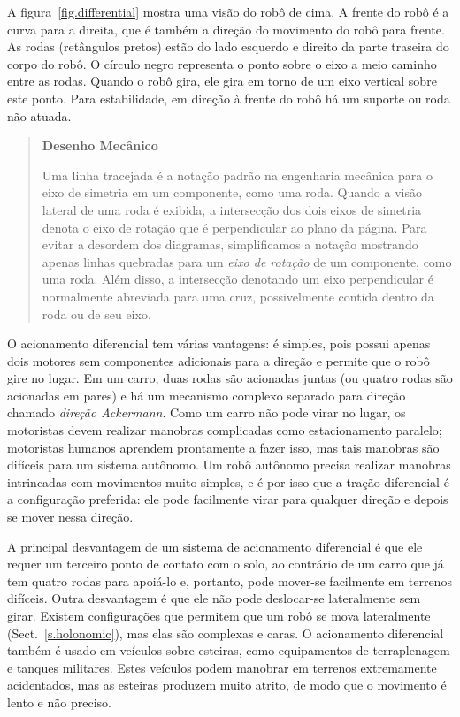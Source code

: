 A figura~\ref{fig.differential} mostra uma visão do robô de cima. A frente do robô é a curva para a direita, que é também a direção do movimento do robô para frente. As rodas (retângulos pretos) estão do lado esquerdo e direito da parte traseira do corpo do robô. O círculo negro representa o ponto sobre o eixo a meio caminho entre as rodas. Quando o robô gira, ele gira em torno de um eixo vertical sobre este ponto. Para estabilidade, em direção à frente do robô há um suporte ou roda não atuada.

\begin{quote}
\begin{center}
\textbf{Desenho Mecânico}
\end{center}
Uma linha tracejada é a notação padrão na engenharia mecânica para o eixo de simetria em um componente, como uma roda. Quando a visão lateral de uma roda é exibida, a intersecção dos dois eixos de simetria denota o eixo de rotação que é perpendicular ao plano da página. Para evitar a desordem dos diagramas, simplificamos a notação mostrando apenas linhas quebradas para um \emph{eixo de rotação} de um componente, como uma roda. Além disso, a intersecção denotando um eixo perpendicular é normalmente abreviada para uma cruz, possivelmente contida dentro da roda ou de seu eixo.
\end{quote}

O acionamento diferencial tem várias vantagens: é simples, pois possui apenas dois motores sem componentes adicionais para a direção e permite que o robô gire no lugar. Em um carro, duas rodas são acionadas juntas (ou quatro rodas são acionadas em pares) e há um mecanismo complexo separado para direção chamado \emph{direção Ackermann}. Como um carro não pode virar no lugar, os motoristas devem realizar manobras complicadas como estacionamento paralelo; motoristas humanos aprendem prontamente a fazer isso, mas tais manobras são difíceis para um sistema autônomo. Um robô autônomo precisa realizar manobras intrincadas com movimentos muito simples, e é por isso que a tração diferencial é a configuração preferida: ele pode facilmente virar para qualquer direção e depois se mover nessa direção.

A principal desvantagem de um sistema de acionamento diferencial é que ele requer um terceiro ponto de contato com o solo, ao contrário de um carro que já tem quatro rodas para apoiá-lo e, portanto, pode mover-se facilmente em terrenos difíceis. Outra desvantagem é que ele não pode deslocar-se lateralmente sem girar. Existem configurações que permitem que um robô se mova lateralmente (Sect.~\ref{s.holonomic}), mas elas são complexas e caras. O acionamento diferencial também é usado em veículos sobre esteiras, como equipamentos de terraplenagem e tanques militares. Estes veículos podem manobrar em terrenos extremamente acidentados, mas as esteiras produzem muito atrito, de modo que o movimento é lento e não preciso.

